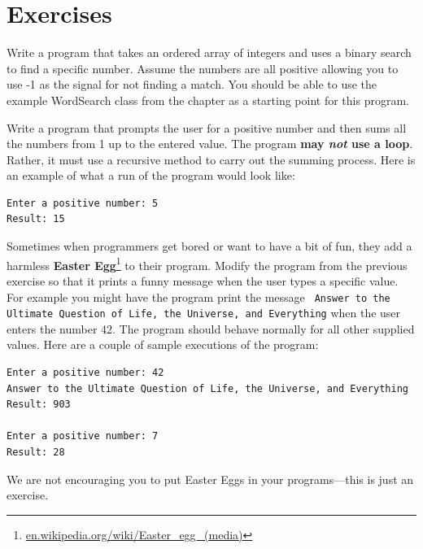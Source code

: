 \newpage

\section{Exercises}

\begin{ex}
Write a program that takes an ordered array of integers and uses a binary search to find a specific number. Assume the numbers are all positive allowing you to use -1 as the signal for not finding a match. You should be able to use the example WordSearch class from the chapter as a starting point for this program.
\end{ex}

\begin{ex}
Write a program that prompts the user for a positive number and then sums all the numbers from 1 up to the entered value. The program \textbf{may \textit{not} use a loop}. Rather, it must use a recursive method to carry out the summing process.
Here is an example of what a run of the program would look like:

\beforeverb
\begin{verbatim}
Enter a positive number: 5
Result: 15
\end{verbatim}
\afterverb

\end{ex}


\begin{ex}
Sometimes when programmers get bored or want to have a bit of fun,
they add a harmless {\bf Easter Egg}\footnote{\url{en.wikipedia.org/wiki/Easter_egg_(media)}} to their program. Modify the program from the previous exercise so that it prints a funny
message when the user types a specific value. For example you might have the program print the message \texttt{ Answer to the Ultimate Question of Life, the Universe, and Everything} when the user enters the number 42. 
The program should behave normally for all other supplied values.  Here are a couple of sample executions of the program:

\beforeverb
\begin{verbatim}
Enter a positive number: 42
Answer to the Ultimate Question of Life, the Universe, and Everything
Result: 903

Enter a positive number: 7
Result: 28
\end{verbatim}
\afterverb
%
We are not encouraging you to put Easter Eggs in your 
programs---this is just an exercise.

\end{ex}

